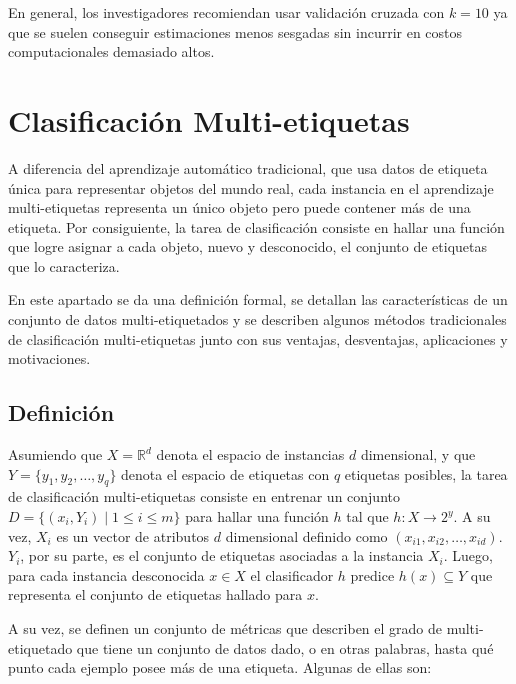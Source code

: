 En general, los investigadores recomiendan usar validación cruzada con $k=10$ ya
que se suelen conseguir estimaciones menos sesgadas sin incurrir en costos
computacionales demasiado altos.

\section{Clasificación Multi-etiquetas}

A diferencia del aprendizaje automático tradicional, que usa datos de etiqueta
única para representar objetos del mundo real, cada instancia en el aprendizaje
multi-etiquetas representa un único objeto pero puede contener más de una
etiqueta. Por consiguiente, la tarea de clasificación consiste en hallar una
función que logre asignar a cada objeto, nuevo y desconocido, el conjunto de
etiquetas que lo caracteriza.

En este apartado se da una definición formal, se detallan las características de
un conjunto de datos multi-etiquetados y se  describen algunos métodos
tradicionales de clasificación multi-etiquetas junto con sus ventajas,
desventajas, aplicaciones y motivaciones.

\subsection{Definición}
\label{mll_def_formal}

Asumiendo que $X=\mathbb{R}^{d}$ denota el espacio de instancias $d$
dimensional, y que $Y = \{y_{1}, y_{2}, \dots, y_{q}\}$ denota el espacio de
etiquetas con $q$ etiquetas posibles, la tarea de clasificación multi-etiquetas
consiste en entrenar un conjunto $D = \{(x_{i}, Y_{i}) \mid 1 \leq i \leq m\}$
para hallar una función $h$ tal que $h: X \rightarrow 2^y$. A su vez, $X_{i}$ es
un vector de atributos $d$ dimensional definido como $(x_{i1}, x_{i2}, \dots,
x_{id})$. $Y_{i}$, por su parte, es el conjunto de etiquetas asociadas a la
instancia $X_{i}$. Luego, para cada instancia desconocida $x \in X$ el
clasificador $h$ predice $h(x) \subseteq Y$ que representa el conjunto de
etiquetas hallado para $x$.

A su vez, se definen un conjunto de métricas que describen el grado de
multi-etiquetado que tiene un conjunto de datos dado, o en otras palabras, hasta
qué punto cada ejemplo posee más de una etiqueta. Algunas de ellas son: 

